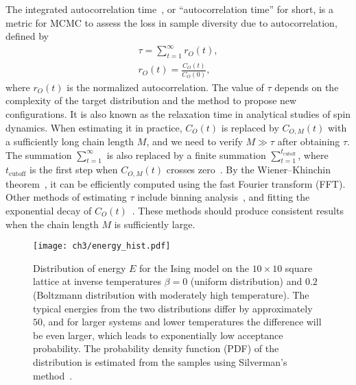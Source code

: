 The integrated autocorrelation time~\cite{ambegaokar2010estimating, goodman2010ensemble}, or ``autocorrelation time'' for short, is a metric for MCMC to assess the loss in sample diversity due to autocorrelation, defined by
\begin{align}
\tau = \sum_{t = 1}^\infty r_O(t), \label{eq:iat} \\
r_O(t) = \frac{C_O(t)}{C_O(0)}, \label{eq:rt}
\end{align}
where $r_O(t)$ is the normalized autocorrelation. The value of $\tau$ depends on the complexity of the target distribution and the method to propose new configurations. It is also known as the relaxation time in analytical studies of spin dynamics. When estimating it in practice, $C_O(t)$ is replaced by $C_{O, M}(t)$ with a sufficiently long chain length $M$, and we need to verify $M \gg \tau$ after obtaining $\tau$. The summation $\sum_{t = 1}^\infty$ is also replaced by a finite summation $\sum_{t = 1}^{t_\text{cutoff}}$, where $t_\text{cutoff}$ is the first step when $C_{O, M}(t)$ crosses zero~\cite{wu2021unbiased}. By the Wiener--Khinchin theorem~\cite{wiener1930generalized}, it can be efficiently computed using the fast Fourier transform (FFT). Other methods of estimating $\tau$ include binning analysis~\cite{wallerberger2018efficient}, and fitting the exponential decay of $C_O(t)$~\cite{bialas2023analysis}. These methods should produce consistent results when the chain length $M$ is sufficiently large.

\begin{figure}[htb]
\centering
\texttt{[image: ch3/energy\_hist.pdf]}
\caption[Distribution of energy for Ising model at different temperatures]{
Distribution of energy $E$ for the Ising model on the $10 \times 10$ square lattice at inverse temperatures $\beta = 0$ (uniform distribution) and $0.2$ (Boltzmann distribution with moderately high temperature).
The typical energies from the two distributions differ by approximately $50$, and for larger systems and lower temperatures the difference will be even larger, which leads to exponentially low acceptance probability.
The probability density function (PDF) of the distribution is estimated from the samples using Silverman’s method~\cite{silverman1986density}.
}
\label{fig:energy-hist}
\end{figure}

